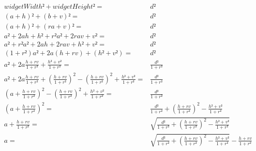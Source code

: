         \begin{align}
            widgetWidth²
            + widgetHeight²
            = & d²
        \\
            (a+h)²
            + (b+v)²
            = & d²
        \\
            (a+h)²
            + (ra+v)²
            = & d²
        \\
            a²
            + 2ah
            + h²
            + r²a²
            + 2rav
            + v²
            = & d²
        \\
            a²
            + r²a²
            + 2ah
            + 2rav
            + h²
            + v²
            = & d²
        \\
            (1+r²)a²
            + 2a(h+rv)
            + (h²+v²)
            = & d²
        \\
            a²
            + 2a\frac{h+rv}{1+r²}
            + \frac{h²+v²}{1+r²}
            = & \frac{d²}{1+r²}
        \\
            a²
            + 2a\frac{h+rv}{1+r²}
            + \left(\frac{h+rv}{1+r²}\right)^{2}
            - \left(\frac{h+rv}{1+r²}\right)^{2}
            + \frac{h²+v²}{1+r²}
            = &  \frac{d²}{1+r²}
        \\
            \left(a+\frac{h+rv}{1+r²}\right)^{2}
            - \left(\frac{h+rv}{1+r²}\right)^{2}
            + \frac{h²+v²}{1+r²}
            = & \frac{d²}{1+r²}
        \\
            \left(a+\frac{h+rv}{1+r²}\right)^{2}
            = & \frac{d²}{1+r²}
            + \left(\frac{h+rv}{1+r²}\right)^{2}
            - \frac{h²+v²}{1+r²}
        \\
            a
            + \frac{h+rv}{1+r²}
            = & \sqrt{
                \frac{d²}{1+r²}
                + \left(\frac{h+rv}{1+r²}\right)^{2}
                -\frac{h²+v²}{1+r²}
            }
        \\
            a
            = & \sqrt{
                \frac{d²}{1+r²}
                + \left(\frac{h+rv}{1+r²}\right)^{2}
                - \frac{h²+v²}{1+r²}
            }
            - \frac{h+rv}{1+r²}
        \end{align}
